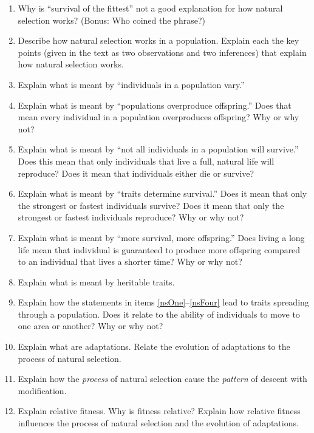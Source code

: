 \documentclass[letterpaper]{tufte-handout}
\begin{document}
\begin{enumerate}

	\item Why is ``survival of the fittest'' not a good explanation for how natural selection works? (Bonus: Who coined the phrase?)

	\item Describe how natural selection works in a population. Explain each the key points (given in the text as two observations and two inferences) that explain how natural selection works.

	\item\label{nsOne} Explain what is meant by ``individuals in a population vary.''

	\item Explain what is meant by ``populations overproduce offspring.'' Does that mean every individual in a population overproduces offspring? Why or why not?

	\item Explain what is meant by ``not all individuals in a population will survive.'' Does this mean that only individuals that live a full, natural life will reproduce? Does it mean that individuals either die or survive?

	\item Explain what is meant by ``traits determine survival.'' Does it mean that only the strongest or fastest individuals survive? Does it mean that only the strongest or fastest individuals reproduce? Why or why not?

	\item\label{nsFour} Explain what is meant by ``more survival, more offspring.'' Does living a long life mean that individual is guaranteed to produce more offspring compared to an individual that lives a shorter time? Why or why not? 

	\item Explain what is meant by heritable traits.

	\item Explain how the statements in items \ref{nsOne}--\ref{nsFour} lead to traits spreading through a population. Does it relate to the ability of individuals to move to one area or another? Why or why not?

	\item Explain what are adaptations. Relate the evolution of adaptations to the process of natural selection.
	
	\item Explain how the \emph{process} of natural selection cause the \emph{pattern} of descent with modification.

	\item Explain relative fitness.  Why is fitness relative? Explain how relative fitness influences the process of natural selection and the evolution of adaptations.  


\end{enumerate}
\end{document}
